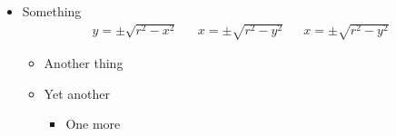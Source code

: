 \documentclass{article}
\begin{document}
\begin{itemize}
  \item Something
    \begin{align}
      y=\pm\sqrt{r^{2} - x^{2}} && x=\pm\sqrt{r^{2} - y^{2}} && x=\pm\sqrt{r^{2} - y^{2}}
    \end{align}
    \begin{itemize}
    \item Another thing
    \item Yet another
      \begin{itemize}
        \item One more
      \end{itemize}
    \end{itemize}
\end{itemize}
\end{document}

